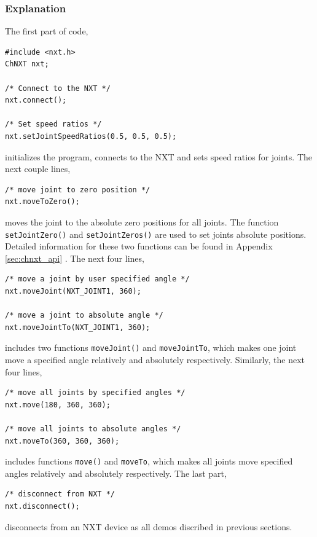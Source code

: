 \documentclass[11pt]{article}
\begin{document}
\subsubsection*{Explanation}
The first part of code,
\begin{verbatim}
#include <nxt.h>
ChNXT nxt;

/* Connect to the NXT */
nxt.connect();

/* Set speed ratios */
nxt.setJointSpeedRatios(0.5, 0.5, 0.5);
\end{verbatim}
\noindent
initializes the program, connects to the NXT and sets speed ratios for joints. The next couple lines,
\begin{verbatim}
/* move joint to zero position */
nxt.moveToZero();
\end{verbatim}
\noindent
moves the joint to the absolute zero positions for all joints. The function \texttt{setJointZero()} and \texttt{setJointZeros()} 
are used to set joints absolute positions. Detailed information for these two functions can be found in Appendix \ref{sec:chnxt_api}
. The next four lines,

\begin{verbatim}
/* move a joint by user specified angle */
nxt.moveJoint(NXT_JOINT1, 360);

/* move a joint to absolute angle */
nxt.moveJointTo(NXT_JOINT1, 360);
\end{verbatim}
includes two functions \texttt{moveJoint()} and \texttt{moveJointTo}, which makes one joint move a specified angle
relatively and absolutely respectively. Similarly, the next four lines,
\begin{verbatim}
/* move all joints by specified angles */
nxt.move(180, 360, 360);

/* move all joints to absolute angles */
nxt.moveTo(360, 360, 360);
\end{verbatim}
includes functions \texttt{move()} and \texttt{moveTo}, which makes all joints move specified angles relatively and absolutely respectively. The last part,
\begin{verbatim}
/* disconnect from NXT */
nxt.disconnect();
\end{verbatim}
disconnects from an NXT device as all demos discribed in previous sections.
\end{document}
